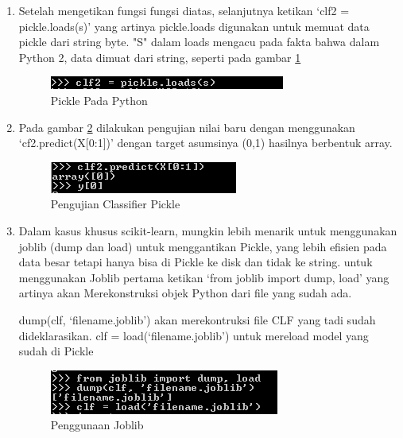 \begin{enumerate}
\item Setelah mengetikan fungsi fungsi diatas, selanjutnya ketikan `clf2 = pickle.loads(s)' yang artinya pickle.loads digunakan untuk memuat data pickle dari string byte. "S" dalam loads mengacu pada fakta bahwa dalam Python 2, data dimuat dari string, seperti pada gambar \ref{gambar8}
\begin{figure}
	\begin{center}
   	 \includegraphics[scale=1]{figures/tasya9.png}
   	 \caption{Pickle Pada Python}
     \label{gambar8}	
	\end{center}
\end{figure}

\item Pada gambar \ref{gambar9} dilakukan pengujian nilai baru dengan menggunakan `cf2.predict(X[0:1])' dengan target asumsinya (0,1) hasilnya berbentuk array.
\begin{figure}
	\begin{center}
   	 \includegraphics[scale=1]{figures/tasya10.png}
   	 \caption{Pengujian Classifier Pickle}
    \label{gambar9}	
	\end{center}
\end{figure}

\item Dalam kasus khusus scikit-learn, mungkin lebih menarik untuk menggunakan joblib (dump dan load) untuk menggantikan Pickle, yang lebih efisien pada data besar tetapi hanya bisa di Pickle ke disk dan tidak ke string. untuk menggunakan Joblib pertama ketikan `from joblib import dump, load' yang artinya akan Merekonstruksi objek Python dari file yang sudah ada.

dump(clf, `filename.joblib') akan merekontruksi file CLF yang tadi sudah dideklarasikan.
clf = load(`filename.joblib') untuk mereload model yang sudah di Pickle
\begin{figure}
	\begin{center}
   	 \includegraphics[scale=1]{figures/tasya11.png}
   	 \caption{Penggunaan Joblib}	
	\end{center}
\end{figure}
\end{enumerate}

